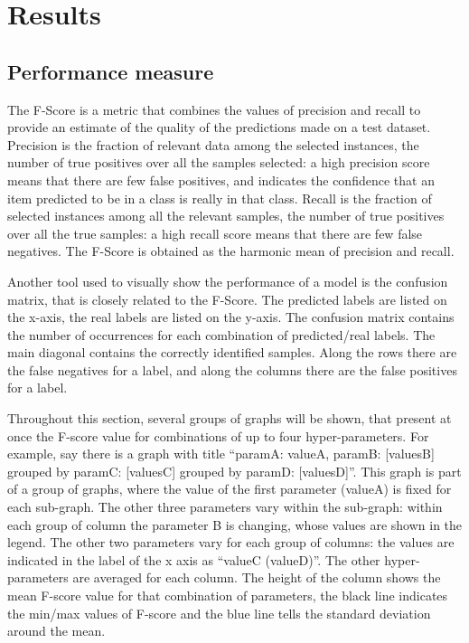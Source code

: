 
\section{Results}
\label{sec:results}

\subsection{Performance measure}

The F-Score is a metric that combines the values of precision and recall to
provide an estimate of the quality of the predictions made on a test dataset.
Precision is the fraction of relevant data among the selected instances, the
number of true positives over all the samples selected: a high precision score
means that there are few false positives, and indicates the confidence that an
item predicted to be in a class is really in that class.
Recall is the fraction of selected instances among all the relevant samples,
the number of true positives over all the true samples: a high recall score
means that there are few false negatives.
%
The F-Score is obtained as the harmonic mean of precision and recall.

Another tool used to visually show the performance of a model
is the confusion matrix, that is closely related to the F-Score.
The predicted labels are listed on the x-axis,
the real labels are listed on the y-axis.
The confusion matrix contains
the number of occurrences
for each combination of predicted/real labels.
The main diagonal contains the correctly identified samples.
Along the rows there are the false negatives for a label,
and along the columns there are the false positives for a label.

Throughout this section, several groups of graphs will be shown, that present
at once the F-score value for combinations of up to four hyper-parameters.
For example, say there is a graph 
with title 
``paramA: valueA, paramB: [valuesB]
grouped by paramC: [valuesC]
grouped by paramD: [valuesD]''.
This graph is part of a group of graphs, where the value of the first parameter
(valueA) is fixed for each sub-graph.
The other three parameters vary within the sub-graph:
within each group of column the parameter B is changing,
whose values are shown in the legend.
The other two parameters vary for each group of columns:
the values are indicated in the label of the x axis as ``valueC (valueD)''.
The other hyper-parameters are averaged for each column.
The height of the column shows the mean F-score value for that
combination of parameters,
the black line indicates the min/max values of F-score and the
blue line tells the standard deviation around the mean.

